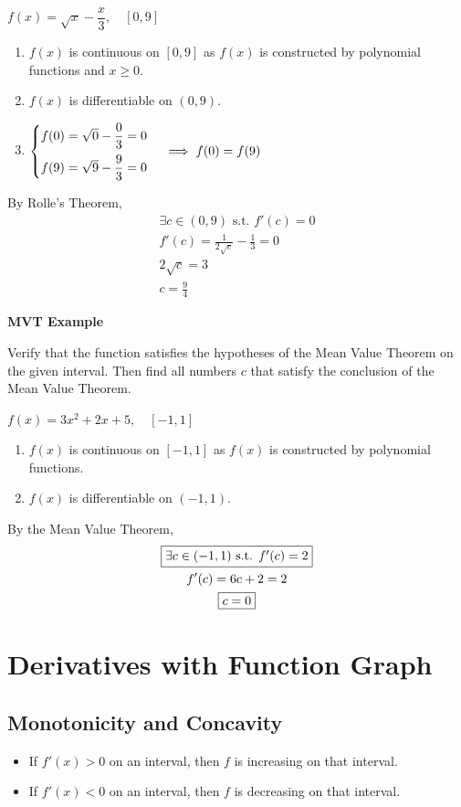 \documentclass{article}
\newcommand{\theorem}[2]{\begin{tcolorbox}[title={#1},colback=blue!5!white,colframe=blue!75!black,parbox=false] #2 \end{tcolorbox}}
\begin{document}
$f(x)=\sqrt{x}-\dfrac{x}{3}, \quad [0,9]$
\begin{enumerate}
    \item $f(x)$ is continuous on $[0,9]$ as $f(x)$ is constructed by polynomial functions and $x\ge 0$.
    \item $f(x)$ is differentiable on $(0,9)$.
    \item $\begin{cases}
        f(0)=\sqrt{0}-\dfrac{0}{3}=0 \vspace{0.5em}\\
    f(9)=\sqrt{9}-\dfrac{9}{3}=0
    \end{cases} \implies f(0)=f(9)$
\end{enumerate}
By Rolle's Theorem,
\begin{gather*}
    \boxed{\exists c \in (0,9) \text{ s.t. } f'(c)=0}\\
    f'(c)=\frac{1}{2\sqrt{c}}-\frac{1}{3}=0\\
    2\sqrt{c}=3\\
    \boxed{c=\frac{9}{4}}
\end{gather*}

\textbf{MVT Example}

Verify that the function satisfies the hypotheses of the Mean Value Theorem on the given interval. Then find all numbers $c$ that satisfy the conclusion of the Mean Value Theorem.

$f(x)=3x^2+2x+5,\quad [-1,1]$
\begin{enumerate}
    \item $f(x)$ is continuous on $[-1,1]$ as $f(x)$ is constructed by polynomial functions.
    \item $f(x)$ is differentiable on $(-1,1)$.
\end{enumerate}
By the Mean Value Theorem,
\begin{gather*}
    \boxed{\exists c \in (-1,1) $ s.t. $ f'(c)=2}\\
    f'(c)=6c+2=2\\
    \boxed{c=0}
\end{gather*}

\section{Derivatives with Function Graph}
\subsection{Monotonicity and Concavity}
\theorem{ Increasing/Decreasing Test } {
    \begin{itemize}
        \item If $f'(x) > 0$ on an interval, then $f$ is increasing on that interval.
        \item If $f'(x) < 0$ on an interval, then $f$ is decreasing on that interval.
    \end{itemize}
}
\end{document}
